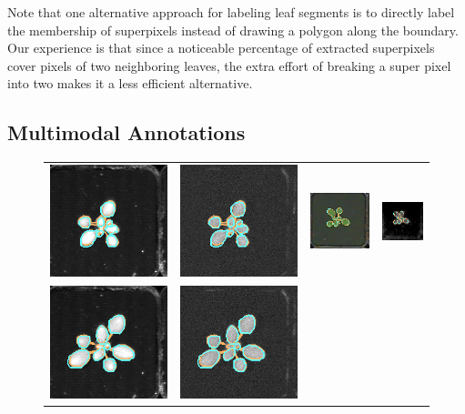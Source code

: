Note that one alternative approach for labeling leaf segments is to directly label the membership of superpixels instead of drawing a polygon along the boundary.
Our experience is that since a noticeable percentage of extracted superpixels cover pixels of two neighboring leaves, the extra effort of breaking a super pixel into two makes it a less efficient alternative.


\subsection{Multimodal Annotations}
\begin{figure}[t]
\begin{centering}
\begin{tabular}{cccc}
\includegraphics[width=.15\textwidth]{Figures/LabelAlignment/day_3_hour_23-seg_ir.png}&
\includegraphics[width=.15\textwidth]{Figures/LabelAlignment/day_3_hour_23-seg_fmp.png}&
\includegraphics[width=.15\textwidth]{Figures/LabelAlignment/day_3_hour_23-seg_rgb.png}&
\includegraphics[width=.15\textwidth]{Figures/LabelAlignment/day_3_hour_23-seg_depth.png}\\
\includegraphics[width=.15\textwidth]{Figures/LabelAlignment/day_5_hour_23-seg_ir.png}&
\includegraphics[width=.15\textwidth]{Figures/LabelAlignment/day_5_hour_23-seg_fmp.png}&

\end{tabular}
\end{centering}
\end{figure}
